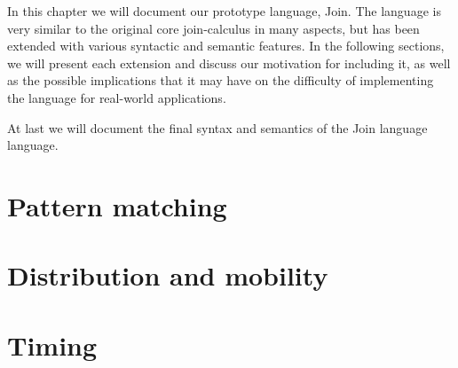 \def\A{\mathcal{A}}
\def\C{\mathcal{C}}
\def\M{\mathcal{M}}
\def\D{\mathcal{D}}
\def\P{\mathcal{P}}
\def\S{\mathcal{S}}
\def\Q{\mathcal{Q}}
\def\atm#1<#2>{#1\left\langle#2\right\rangle}
\def\Go<#1>{\text{go}\left\langle#1\right\rangle}
\def\Halt<>{\text{halt}\langle\rangle}
\def\toJ#1{\stackrel{#1}{\triangleright}}
\def\inJ{~\mathbf{in}~}
\def\join#1in#2#3{#1\toJ{#2}#3}
\def\mscG#1#2{\vdash^{#1}_{#2}}
\def\mscJ{\mscG{t}{\phi}}
\def\timeJ#1{\stackrel{#1}{\propto}}
\def\defJ{~\mathbf{def}~}
\def\match{~\mathbf{match}~}
\def\with{~\mathbf{with}~}
\def\linkUp#1{\stackrel{#1}{\diamond}}
\def\migrates(#1,#2){\xLongrightarrow{#1\mapsto#2}}
\def\reduceable(#1){\text{reduceable}\left(#1\right)}
\def\quiet(#1){\text{quiet}\left(#1\right)}
\def\halted(#1){\text{halted}\left(#1\right)}
\def\doms#1{\fbox{\rule[-0.75em]{0pt}{2em}#1}}

In this chapter we will document our prototype language, Join.  The
language is very similar to the original core join-calculus in many
aspects, but has been extended with various syntactic and semantic
features. In the following sections, we will present each extension
and discuss our motivation for including it, as well as the possible
implications that it may have on the difficulty of implementing the
language for real-world applications.

At last we will document the final syntax and semantics of the Join
language language.


\section{Pattern matching}

\section{Distribution and mobility}

\section{Timing}

